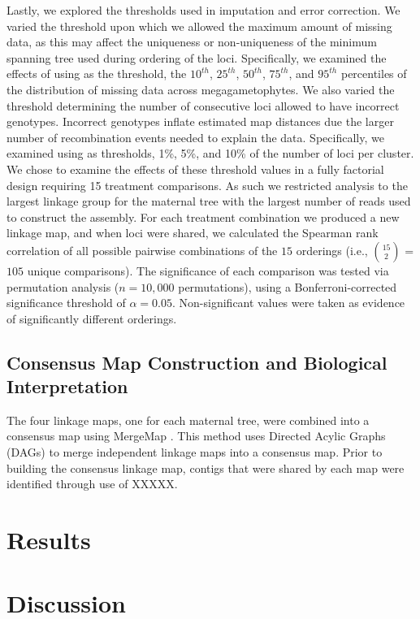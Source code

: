 \documentclass[11pt]{article}
\begin{document}
Lastly, we explored the thresholds used in imputation and error correction. We varied the threshold upon which
we allowed the maximum amount of missing data, as this may affect the uniqueness 
or non-uniqueness of the minimum spanning tree used during ordering of the loci. Specifically,
we examined the effects of using as the threshold, the $10^{th}$, $25^{th}$, $50^{th}$, $75^{th}$, and $95^{th}$ percentiles of
the distribution of missing data across megagametophytes. We also varied the threshold determining 
the number of consecutive loci allowed to have incorrect genotypes. Incorrect genotypes inflate estimated
map distances due the larger number of recombination events needed to explain the data. Specifically, we
examined using as thresholds, 1\%, 5\%, and 10\% of the number of loci per cluster. We chose to examine the 
effects of these threshold values in a fully factorial design requiring 15 treatment comparisons. As such we restricted
analysis to the largest linkage group for the maternal tree with the largest number of reads used to construct
the assembly. For each treatment combination we produced a new linkage map, and when loci were shared, we calculated
the Spearman rank correlation of all possible pairwise combinations of the $15$ orderings (i.e., {$15 \choose 2$} = $105$ unique
comparisons). The significance of each comparison was tested via permutation analysis ($n = 10,000$ permutations), 
using a Bonferroni-corrected significance threshold of $\alpha = 0.05$. Non-significant values were taken as evidence of significantly different orderings.

\subsection*{Consensus Map Construction and Biological Interpretation}
The four linkage maps, one for each maternal tree, were combined into a consensus map using MergeMap \citep{Wu:2008b}. This
method uses Directed Acylic Graphs (DAGs) to merge independent linkage maps into a consensus map. Prior to building the consensus 
linkage map, contigs that were shared by each map were identified through use of XXXXX.

\section*{Results}

\section*{Discussion}
\end{document}
